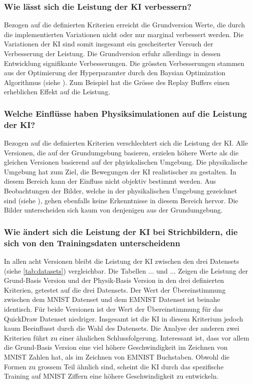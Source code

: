 {\subsubsection*{Wie lässt sich die Leistung der KI verbessern?}
\label{subsub:d_frage_unter_3}
Bezogen auf die definierten Kriterien erreicht die Grundversion Werte, die durch
die implementierten Variationen nicht oder nur marginal verbessert werden. Die
Variationen der KI sind somit insgesamt ein gescheiterter Versuch der
Verbesserung der Leistung. Die Grundversion erfuhr allerdings in dessen
Entwicklung signifikante Verbesserungen. Die grössten Verbesserungen stammen aus
der Optimierung der Hyperparamter durch den Baysian Optimization Algorithmus
(siehe ). Zum Beispiel hat die Grösse des Replay
Buffers einen erheblichen Effekt auf die Leistung.

\subsubsection*{Welche Einflüsse haben Physiksimulationen auf die Leistung der KI?}
\label{subsub:d_frage_unter_4}
Bezogen auf die definierten Kriterien verschlechtert sich die Leistung der KI.
Alle Versionen, die auf der Grundumgebung basieren, erzielen höhere Werte als
die gleichen Versionen basierend auf der phyiskalischen Umgebung. Die
physikalische Umgebung hat zum Ziel, die Bewegungen der KI realistischer zu
gestalten. In diesem Bereich kann der Einfluss nicht objektiv bestimmt werden.
Aus Beobachtungen der Bilder, welche in der physikalischen Umgebung gezeichnet
sind (siehe ), gehen ebenfalls keine Erkenntnisse in diesem
Bereich hervor. Die Bilder unterscheiden sich kaum von denjenigen aus der
Grundumgebung.

\subsubsection*{Wie ändert sich die Leistung der KI bei Strichbildern, die sich von den Trainingsdaten unterscheidenn}
\label{subsub:d_frage_unter_5}
In allen acht Versionen bleibt die Leistung der KI zwischen den drei Datensets
(siehe \autoref{tab:datasets}) vergleichbar. Die Tabellen {...} und {...} Zeigen
die Leistung der Grund-Basis Version und der Physik-Basis Version in den drei
definierten Kriterien, getestet auf die drei Datensets. Der Wert der
Übereinstimmung zwischen dem MNIST Datenset und dem EMNIST Datenset ist beinahe
identisch. Für beide Versionen ist der Wert der Übereinstimmung für das
QuickDraw Datenset niedriger. Insgesamt ist die KI in diesem Kriterium jedoch
kaum Beeinflusst durch die Wahl des Datensets. Die Analyse der anderen zwei
Kriterien führt zu einer ähnlichen Schlussfolgerung. Interessant ist, dass vor
allem die Grund-Basis Version eine viel höhere Geschwindigkeit im Zeichnen von
MNIST Zahlen hat, als im Zeichnen von EMNIST Buchstaben. Obwohl die Formen zu
grossem Teil ähnlich sind, scheint die KI durch das spezifische Training auf
MNIST Ziffern eine höhere Geschwindigkeit zu entwickeln. 

}
